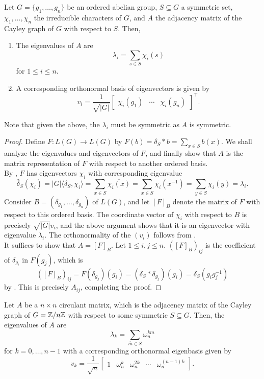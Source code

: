 		\begin{ftheo}
			Let $G = \{g_1,\ldots,g_n\}$ be an ordered abelian group, $S \subseteq G$ a symmetric set, $\chi_1,\ldots,\chi_n$ the irreducible characters of $G$, and $A$ the adjacency matrix of the Cayley graph of $G$ with respect to $S$. Then,
			\begin{enumerate}[label=(\alph*)]
				\item The eigenvalues of $A$ are
				\[ \lambda_i = \sum_{s \in S} \chi_i(s) \]
				for $1 \le i \le n$.
				\item A corresponding orthonormal basis of eigenvectors is given by
				\[ v_i = \frac{1}{\sqrt{|G|}} \begin{bmatrix} \chi_i(g_1) & \cdots & \chi_i(g_n) \end{bmatrix}^\top. \]
			\end{enumerate}
		\end{ftheo}
		Note that given the above, the $\lambda_i$ must be symmetric as $A$ is symmetric.
		\begin{proof}
			Define $F : L(G) \to L(G)$ by $F(b) = \delta_S * b = \sum_{x \in S} b(x)$. We shall analyze the eigenvalues and eigenvectors of $F$, and finally show that $A$ is the matrix representation of $F$ with respect to another ordered basis.\\
			By , $F$ has eigenvectors $\chi_i$ with corresponding eigenvalue
			\[ \hat{\delta}_S(\chi_i) = |G| \langle \delta_S,\chi_i\rangle = \sum_{x \in S} \overline{\chi_i(x)} = \sum_{x \in S} \chi_i(x^{-1}) = \sum_{y \in S} \chi_i(y) = \lambda_i. \]
			Consider $B = (\delta_{g_1},\ldots,\delta_{g_n})$ of $L(G)$, and let $[F]_B$ denote the matrix of $F$ with respect to this ordered basis.
			The coordinate vector of $\chi_i$ with respect to $B$ is precisely $\sqrt{|G|} v_i$, and the above argument shows that it is an eigenvector with eigenvalue $\lambda_i$. The orthonormality of the $(v_i)$ follows from .\\
			It suffices to show that $A = [F]_B$. Let $1 \le i,j \le n$. $([F]_B)_{ij}$ is the coefficient of $\delta_{g_i}$ in $F(g_j)$, which is
			\[ ([F]_B)_{ij} = F(\delta_{g_j})(g_i) = (\delta_S * \delta_{g_j})(g_i) = \delta_S(g_ig_j^{-1}) \]
			by . This is precisely $A_{ij}$, completing the proof.
		\end{proof}

		\begin{fcor}
			Let $A$ be a $n\times n$ circulant matrix, which is the adjacency matrix of the Cayley graph of $G = \mathbb{Z}/n\mathbb{Z}$ with respect to some symmetric $S \subseteq G$. Then, the eigenvalues of $A$ are
			\[ \lambda_k = \sum_{\overline{m} \in S} \omega_n^{km} \]
			for $k = 0,\ldots,n-1$ with a corresponding orthonormal eigenbasis given by
			\[ v_k = \frac{1}{\sqrt{n}} \begin{bmatrix} 1 & \omega_n^k & \omega_n^{2k} & \cdots & \omega_n^{(n-1)k} \end{bmatrix}. \]
		\end{fcor}


